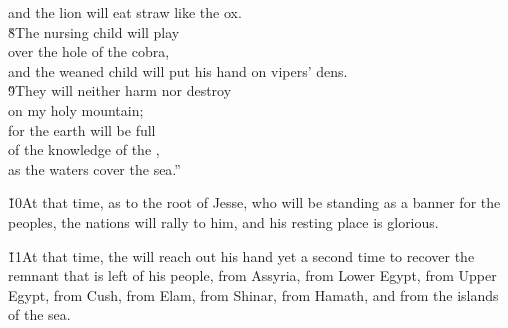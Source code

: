 \begin{poetry}
\poemlll       and the lion will eat straw like the ox. \\
\poeml \v{8}The nursing child will play \\
\poemll    over the hole of the cobra, \\
\poemlll       and the weaned child will put his hand on vipers' dens. \\
\poeml \v{9}They will neither harm nor destroy \\
\poemll    on my holy mountain; \\
\poeml for the earth will be full \\
\poemll    of the knowledge of the , \\
\poemlll       as the waters cover the sea.''
\end{poetry}

\v{10}At that time, as to the root of Jesse, who will be standing as a banner for the peoples, the nations will rally to him, and his resting place is glorious.

\v{11}At that time, the  will reach out his hand yet a second time to recover the remnant that is left of his people, from Assyria, from Lower Egypt, from Upper Egypt, from Cush, from Elam, from Shinar, from Hamath, and from the islands of the sea.

